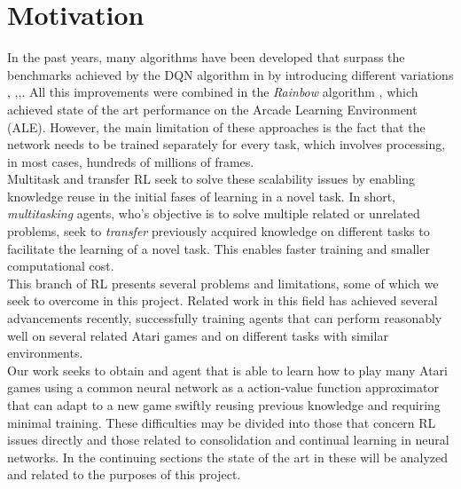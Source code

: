 \documentclass{article}
\begin{document}
\section{Motivation}
In the past years, many algorithms have been developed that surpass the benchmarks achieved by the DQN algorithm in \citep{MnihPlayingLearning} by introducing different variations \citep{Mnih2015Human-levelLearning}, \citep{vanHasselt2015DeepQ-learning},\citep{Wang2015DuelingLearning},\citep{Bellemare2017ALearning}. All this improvements were combined in the \textit{Rainbow} algorithm \citep{Hessel2017Rainbow:Learning}, which achieved state of the art performance on the Arcade Learning Environment (ALE)\citep{Bellemare2013TheAgents}. However, the main limitation of these approaches is the fact that the network needs to be trained separately for every task, which involves processing, in most cases, hundreds of millions of frames.\\
\newline 
Multitask and transfer RL seek to solve these scalability issues by enabling knowledge reuse in the initial fases of learning in a novel task. In short, \textit{multitasking} agents, who's objective is to solve multiple related or unrelated problems, seek to \textit{transfer} previously acquired knowledge on different tasks to facilitate the learning of a novel task. This enables faster training and smaller computational cost.\\
This branch of RL presents several problems and limitations, some of which we seek to overcome in this project. Related work in this field has achieved several advancements recently, successfully training agents that can perform reasonably well on several related Atari games and on different tasks with similar environments.\\
Our work seeks to obtain and agent that is able to learn how to play many Atari games using a common neural network as a action-value function approximator that can adapt to a new game swiftly reusing previous knowledge and requiring minimal training.
These difficulties may be divided into those that concern RL issues directly and those related to consolidation and continual learning in neural networks. In the continuing sections the state of the art in these will be analyzed and related to the purposes of this project.
\end{document}

